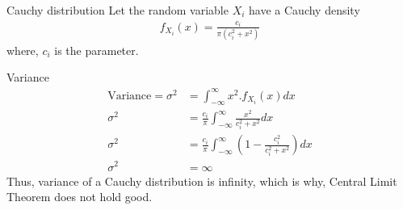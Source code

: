 \documentclass{beamer}
\providecommand{\brak}[1]{\ensuremath{\left(#1\right)}}
\providecommand{\brak}[1]{\ensuremath{\left(#1\right)}}
\begin{document}
\begin{frame}{Cauchy distribution}
    Let the random variable $X_i$ have a Cauchy density
    \begin{align}
        f_{X_i}(x) = \frac{c_i}{\pi (c_i^2 + x^2)}
    \end{align}
    where, $c_i$ is the parameter.
\end{frame}
\begin{frame}{Variance}
\begin{align}
    \text{Variance} = \sigma^2 &= \int_{-\infty}^\infty x^2.f_{X_i}(x) dx\\
    \sigma^2 &= \frac{c_i}{\pi} \int_{-\infty}^\infty \frac{x^2}{c_i^2 + x^2}dx\\
    \sigma^2 &= \frac{c_i}{\pi} \int_{-\infty}^\infty \brak{1 - \frac{c_i^2}{c_i^2 + x^2}}dx\\
    \sigma^2 &= \infty
\end{align}
Thus, variance of a Cauchy distribution is infinity, which is why, Central Limit Theorem does not hold good.
\end{frame}
\end{document}
